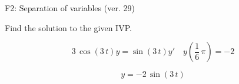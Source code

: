 \begin{exercise}
  \begin{exerciseTitle}F2: Separation of variables (ver. 29)\end{exerciseTitle}
  \begin{exerciseStatement}
    
Find the solution to the given IVP.

    
\[3 \, \cos\left(3 \, t\right) y= \sin\left(3 \, t\right) y'\hspace{1em} y\left( \frac{1}{6} \, \pi \right)= -2\]

  \end{exerciseStatement}
  \begin{exerciseAnswer}
    
\[y= -2 \, \sin\left(3 \, t\right)\]

  \end{exerciseAnswer}
\end{exercise}